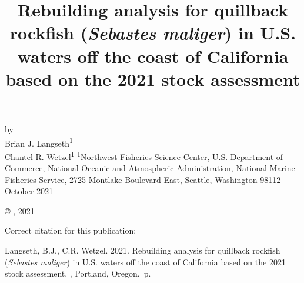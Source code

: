 \documentclass[11pt,
  english,
  letterpaper,
]{article}
\date{}
\newcommand{\trTitle}{Rebuilding analysis for quillback rockfish (\emph{Sebastes maliger}) in U.S. waters off the coast of California based on the 2021 stock assessment}
\newcommand{\trYear}{2021}
\newcommand{\trMonth}{October}
\newcommand{\trAuthsBack}{Langseth, B.J., C.R. Wetzel}
\newcommand{\trCitation}{
\begin{hangparas}{1em}{1}
\trAuthsBack{}. \trYear{}. \trTitle{}. \glsentrylong{pfmc}, Portland, Oregon. \pageref{LastPage}{}\,p.
\end{hangparas}}
\begin{document}

\renewcommand*{\thefootnote}{\fnsymbol{footnote}}

\small
\thispagestyle{empty}
\noindent
\begin{center}
\title{Rebuilding analysis for quillback rockfish (\emph{Sebastes maliger}) in U.S. waters off the coast of California based on the 2021 stock assessment}
\vspace{1.5cm}
{\Large\textbf{}}
\vfill
by\\
Brian J. Langseth\textsuperscript{1}\\
Chantel R. Wetzel\textsuperscript{1}\vfill
\textsuperscript{1}Northwest Fisheries Science Center, U.S. Department of Commerce, National Oceanic and Atmospheric Administration, National Marine Fisheries Service, 2725 Montlake Boulevard East, Seattle, Washington 98112\vfill
\trMonth{} \trYear{}
\end{center}
\clearpage

\thispagestyle{empty}
\vspace*{\fill}
\begin{center}
\copyright{} , \trYear{}\\
\end{center}
\par
\bigskip
\noindent
Correct citation for this publication:
\bigskip
\par
\trCitation{}
\clearpage


\tableofcontents\clearpage
\label{TRlastRoman}
\clearpage

\newpage
\thispagestyle{empty} %

\pagestyle{plain}  %
\renewcommand*{\thefootnote}{\arabic{footnote}}  %
\setcounter{footnote}{0}  %
\renewcommand{\headrulewidth}{0.5pt}
\renewcommand{\footrulewidth}{0.5pt}
\end{document}
